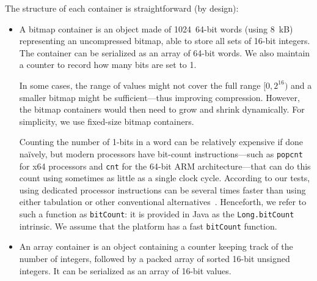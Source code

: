 \documentclass[times]{speauth}
\begin{document}
The structure of each container is straightforward (by design):
\begin{itemize}
\item A bitmap container is an object made of \num{1024}~64-bit words (using \SI{8}{kB}) representing an uncompressed bitmap, able to store all sets of 16-bit integers. The container can be serialized as an array of 64-bit words. We also
maintain
a counter to record how many bits are set to 1.

In some cases, the range of values might not cover the full range $[0,2^{16})$ and a smaller bitmap might be sufficient---thus improving compression. However, the bitmap containers would then need to grow and shrink dynamically. For simplicity, we use fixed-size bitmap containers.


Counting the number of 1-bits in a word can be relatively expensive if done na\"ively, but modern processors have bit-count instructions---such as \texttt{popcnt} for x64 processors and \texttt{cnt} for the 64-bit ARM architecture---that can do this count using sometimes as little as a single clock cycle. According to our tests, using dedicated processor instructions can be several times faster than using either tabulation or other conventional alternatives~\cite{warr:hackers-delight-2e}.
Henceforth, we refer to such a function as \texttt{bitCount}: it is provided in Java as the \texttt{Long.bitCount} intrinsic. We assume that the platform has a fast  \texttt{bitCount} function.
\item An array container is an object containing a counter keeping track of the number of integers, followed by a packed array of sorted 16-bit unsigned integers. It can be serialized as
an array of
16-bit values.


\end{itemize}
\end{document}
